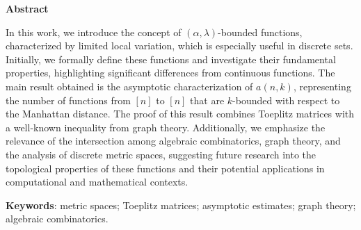 \begin{center}
  \large \textbf{Abstract}
\end{center}
\vspace{1cm}
\par In this work, we introduce the concept of $(\alpha, \lambda)$-bounded functions, characterized by limited local variation, which is especially useful in discrete sets. Initially, we formally define these functions and investigate their fundamental properties, highlighting significant differences from continuous functions. The main result obtained is the asymptotic characterization of $a(n, k)$, representing the number of functions from $[n]$ to $[n]$ that are $k$-bounded with respect to the Manhattan distance. The proof of this result combines Toeplitz matrices with a well-known inequality from graph theory. Additionally, we emphasize the relevance of the intersection among algebraic combinatorics, graph theory, and the analysis of discrete metric spaces, suggesting future research into the topological properties of these functions and their potential applications in computational and mathematical contexts.

\vspace{1cm}

\begin{raggedleft}
  \textbf{Keywords}: metric spaces; Toeplitz matrices; asymptotic estimates; graph theory; algebraic combinatorics.
\end{raggedleft}
